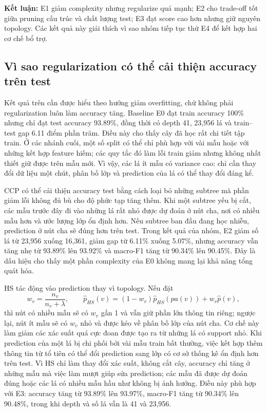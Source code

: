 \textbf{Kết luận:} E1 giảm complexity nhưng regularize quá mạnh; E2 cho trade-off tốt giữa pruning cấu trúc và chất lượng test; E3 đạt score cao hơn nhưng giữ nguyên topology. Các kết quả này giải thích vì sao nhóm tiếp tục thử E4 để kết hợp hai cơ chế bổ trợ.

\subsection*{Vì sao regularization có thể cải thiện accuracy trên test}

Kết quả trên cần được hiểu theo hướng giảm overfitting, chứ không phải regularization luôn làm accuracy tăng. Baseline E0 đạt train accuracy 100\% nhưng chỉ đạt test accuracy 93.89\%, đồng thời có depth 41, 23,956 lá và train--test gap 6.11 điểm phần trăm. Điều này cho thấy cây đã học rất chi tiết tập train. Ở các nhánh cuối, một số split có thể chỉ phù hợp với vài mẫu hoặc với những kết hợp feature hiếm; các quy tắc đó làm lỗi train giảm nhưng không nhất thiết giữ được trên mẫu mới. Vì vậy, các lá ít mẫu có variance cao: chỉ cần thay đổi dữ liệu một chút, phân bố lớp và prediction của lá có thể thay đổi đáng kể.

CCP có thể cải thiện accuracy test bằng cách loại bỏ những subtree mà phần giảm lỗi không đủ bù cho độ phức tạp tăng thêm. Khi một subtree yếu bị cắt, các mẫu trước đây đi vào những lá rất nhỏ được dự đoán ở nút cha, nơi có nhiều mẫu hơn và ước lượng lớp ổn định hơn. Nếu subtree ban đầu đang học nhiễu, prediction ở nút cha sẽ đúng hơn trên test. Trong kết quả của nhóm, E2 giảm số lá từ 23,956 xuống 16,361, giảm gap từ 6.11\% xuống 5.07\%, nhưng accuracy vẫn tăng nhẹ từ 93.89\% lên 93.92\% và macro-F1 tăng từ 90.34\% lên 90.45\%. Đây là dấu hiệu cho thấy một phần complexity của E0 không mang lại khả năng tổng quát hóa.

HS tác động vào prediction thay vì topology. Nếu đặt
\[
w_v=\frac{n_v}{n_v+\lambda},
\qquad
\hat p_{HS}(v)=(1-w_v)\hat p_{HS}(pa(v))+w_v\hat p(v),
\]
thì nút có nhiều mẫu sẽ có $w_v$ gần 1 và vẫn giữ phần lớn thông tin riêng; ngược lại, nút ít mẫu sẽ có $w_v$ nhỏ và được kéo về phân bố lớp của nút cha. Cơ chế này làm giảm các xác suất quá cực đoan được tạo ra từ những lá có support nhỏ. Khi prediction của một lá bị chi phối bởi vài mẫu train bất thường, việc kết hợp thêm thông tin từ tổ tiên có thể đổi prediction sang lớp có cơ sở thống kê ổn định hơn trên test. Vì HS chỉ làm thay đổi xác suất, không cắt cây, accuracy chỉ tăng ở những mẫu mà việc làm mượt giúp sửa prediction; các mẫu đã được dự đoán đúng hoặc các lá có nhiều mẫu hầu như không bị ảnh hưởng. Điều này phù hợp với E3: accuracy tăng từ 93.89\% lên 93.97\%, macro-F1 tăng từ 90.34\% lên 90.48\%, trong khi depth và số lá vẫn là 41 và 23,956.

